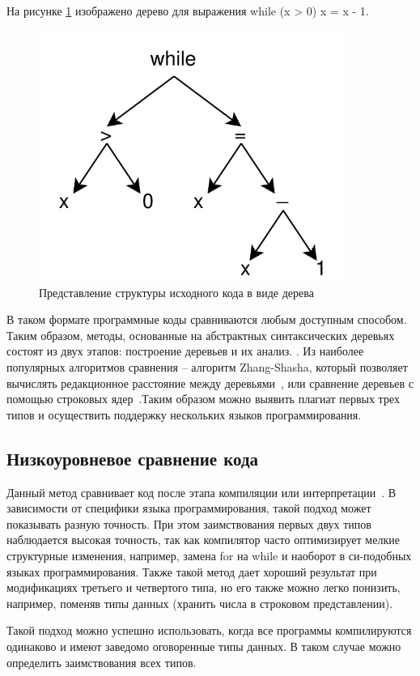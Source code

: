 На рисунке \ref{img:ast}  изображено дерево для выражения while (x > 0) x = x - 1.
\begin{figure}[!h]
	\centering
	\includegraphics[width=100mm]{img/ast2}
	\captionsetup{justification=centering}
	\centering\caption{Представление структуры исходного кода в виде дерева}
	\label{img:ast}
\end{figure}

В таком формате программные коды сравниваются любым доступным способом. Таким образом, методы, основанные на абстрактных синтаксических деревьях состоят из двух этапов: построение деревьев и их анализ. . Из наиболее популярных алгоритмов сравнения -- алгоритм Zhang-Shasha, который позволяет вычислять редакционное расстояние между деревьями~\cite{zhang}, или сравнение деревьев с помощью строковых ядер~\cite{kernel}.Таким образом можно выявить плагиат первых трех типов и осуществить поддержку нескольких языков программирования. 

\subsection{Низкоуровневое сравнение кода}

Данный метод сравнивает код после этапа компиляции или интерпретации~\cite{binary}. В зависимости от специфики языка программирования, такой подход может показывать разную точность. При этом заимствования первых двух типов наблюдается высокая точность, так как компилятор часто оптимизирует мелкие структурные изменения, например, замена for на while и наоборот в си-подобных языках программирования. Также такой метод дает хороший результат при модификациях третьего и четвертого типа, но его также можно легко понизить, например, поменяв типы данных (хранить числа в строковом представлении).

Такой подход можно успешно использовать, когда все программы компилируются одинаково и  имеют заведомо оговоренные типы данных. В таком случае можно определить заимствования всех типов.
